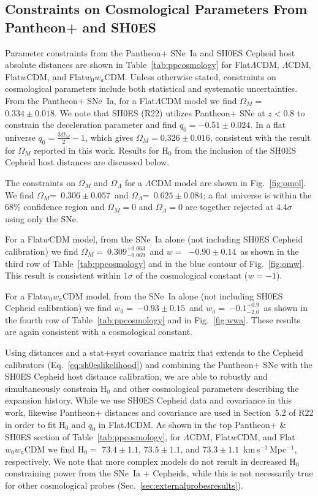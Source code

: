 \documentclass[twocolumn]{aastex63}
\def\fLCDMOMPan{$0.334\pm0.018$}
\def\oLCDMOMPan{$0.306\pm0.057$}
\def\oLCDMOLPan{$0.625\pm0.084$}
\def\oLCDMHPanSH{$73.4\pm1.1$}
\def\wPanSH{$-0.90\pm 0.14$}
\def\OMPanSH{$0.309^{+0.063}_{-0.069}$}
\def\HPanSH{$73.5\pm1.1$}
\def\wwawnPan{$-0.93\pm0.15$}
\def\wwawaPan{$-0.1^{+0.9}_{-2.0}$}
\def\wwaHPanSH{$73.3\pm1.1$}
\begin{document}
\subsection{Constraints on Cosmological Parameters From Pantheon+ and SH0ES}

Parameter constraints from the Pantheon+ {SNe~Ia} and SH0ES {Cepheid host absolute distances} are shown in Table~\ref{tab:ppcosmology} for Flat$\Lambda$CDM, $\Lambda$CDM, Flat$w$CDM, and Flat$w_0w_a$CDM. Unless otherwise stated, constraints on cosmological parameters include both statistical and systematic uncertainties. 
From the Pantheon+ SNe~Ia, for a Flat$\Lambda$CDM model we find $\Omega_M=~$\fLCDMOMPan. We note that SH0ES (R22) utilizes Pantheon+ SNe at $z<0.8$ to constrain the deceleration parameter and find $q_0=-0.51\pm0.024$. In a flat universe  $q_0=\frac{3\Omega_M}{2}-1$, which gives $\Omega_M = 0.326\pm0.016$, consistent with the result for $\Omega_M$ reported in this work. { Results for H$_0$ from the inclusion of the SH0ES Cepheid host distances are discussed below.}

The constraints on $\Omega_M$ and $\Omega_\Lambda$ for a $\Lambda$CDM model are shown in Fig.~\ref{fig:omol}. We find  $\Omega_M$=~\oLCDMOMPan\ and $\Omega_\Lambda$=~\oLCDMOLPan; a flat universe is within the 68\% confidence region and $\Omega_M=0$ and $\Omega_\Lambda=0$ are together rejected at 4.4$\sigma$ using only the SNe.

For a Flat$w$CDM model, from the SNe~Ia alone { (not including SH0ES Cepheid calibration)} we find $\Omega_M=~$\OMPanSH\ and $w=$~\wPanSH\ as shown in the third row of Table~\ref{tab:ppcosmology} and in the blue contour of Fig.~\ref{fig:omw}.  This result is consistent within $1\sigma$ of the cosmological constant ($w=-1$).


For a Flat$w_0w_a$CDM model, from the SNe~Ia alone { (not including SH0ES Cepheid calibration)}  we find $w_0=~$\wwawnPan\ and $w_a=~$\wwawaPan\ as shown in the fourth row of Table~\ref{tab:ppcosmology} and in Fig.~\ref{fig:wwa}. These results are again consistent with a cosmological constant.

Using distances and a stat+syst covariance matrix that extends to the Cepheid calibrators (Eq.~\ref{eq:sh0eslikelihood}) {  and combining the Pantheon+ SNe with the SH0ES Cepheid host distance calibration}, we are able to robustly and simultaneously constrain H$_0$ and other cosmological parameters describing the expansion history.
 {While we use SH0ES Cepheid data and covariance in this work, likewise Pantheon+ distances and covariance are used in Section~5.2 of R22 in order} to fit H$_0$ and $q_0$ in Flat$\Lambda$CDM. As shown in the top Pantheon+ \& SH0ES section of Table~\ref{tab:ppcosmology}, for $\Lambda$CDM, Flat$w$CDM, and Flat$w_0w_a$CDM we find H$_0=$ \oLCDMHPanSH, \HPanSH, and \wwaHPanSH\ km\,s$^{-1}$\,Mpc$^{-1}$, respectively. We note that more complex models do not result in decreased H$_0$ constraining power from the SNe~Ia + Cepheids, while this is not necessarily true for other cosmological probes (Sec.~\ref{sec:externalprobesresults}).
\end{document}
